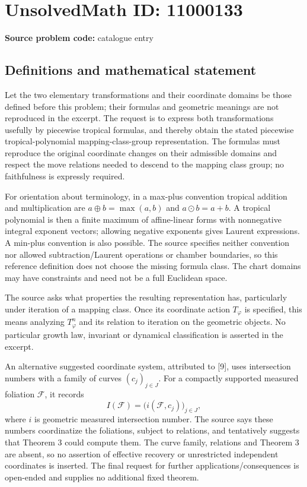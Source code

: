 \documentclass[11pt]{article}
\begin{document}
\section*{UnsolvedMath ID: 11000133}
\textbf{Source problem code:} catalogue entry
\subsection{Definitions and mathematical statement}
Let the two elementary transformations and their coordinate domains be those defined before this problem; their formulas and geometric meanings are not reproduced in the excerpt. The request is to express both transformations usefully by piecewise tropical formulas, and thereby obtain the stated piecewise tropical-polynomial mapping-class-group representation. The formulas must reproduce the original coordinate changes on their admissible domains and respect the move relations needed to descend to the mapping class group; no faithfulness is expressly required.

For orientation about terminology, in a max-plus convention tropical addition and multiplication are \(a\oplus b=\max(a,b)\) and \(a\odot b=a+b\). A tropical polynomial is then a finite maximum of affine-linear forms with nonnegative integral exponent vectors; allowing negative exponents gives Laurent expressions. A min-plus convention is also possible. The source specifies neither convention nor allowed subtraction/Laurent operations or chamber boundaries, so this reference definition does not choose the missing formula class. The chart domains may have constraints and need not be a full Euclidean space.

The source asks what properties the resulting representation has, particularly under iteration of a mapping class. Once its coordinate action \(T_\varphi\) is specified, this means analyzing \(T_\varphi^n\) and its relation to iteration on the geometric objects. No particular growth law, invariant or dynamical classification is asserted in the excerpt.

An alternative suggested coordinate system, attributed to [9], uses intersection numbers with a family of curves \((c_j)_{j\in J}\). For a compactly supported measured foliation \(\mathcal F\), it records
\[I(\mathcal F)=\bigl(i(\mathcal F,c_j)\bigr)_{j\in J},\]
where \(i\) is geometric measured intersection number. The source says these numbers coordinatize the foliations, subject to relations, and tentatively suggests that Theorem 3 could compute them. The curve family, relations and Theorem 3 are absent, so no assertion of effective recovery or unrestricted independent coordinates is inserted. The final request for further applications/consequences is open-ended and supplies no additional fixed theorem.
\end{document}
